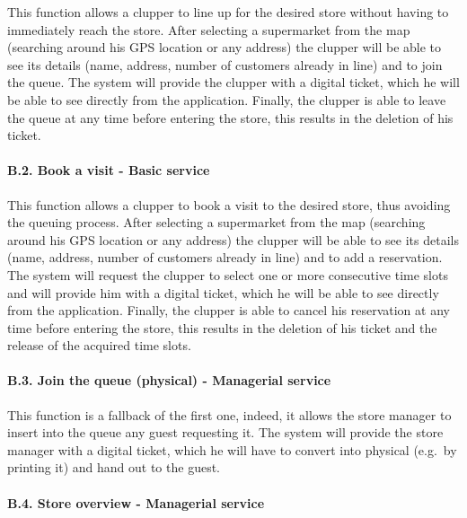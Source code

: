 \documentclass[
]{article}
\begin{document}
This function allows a clupper to line up for the desired store without
having to immediately reach the store. After selecting a supermarket
from the map (searching around his GPS location or any address) the
clupper will be able to see its details (name, address, number of
customers already in line) and to join the queue. The system will
provide the clupper with a digital ticket, which he will be able to see
directly from the application. Finally, the clupper is able to leave the
queue at any time before entering the store, this results in the
deletion of his ticket.

\hypertarget{b.2.-book-a-visit---basic-service}{%
\paragraph{B.2. Book a visit - Basic
service}\label{b.2.-book-a-visit---basic-service}}

This function allows a clupper to book a visit to the desired store,
thus avoiding the queuing process. After selecting a supermarket from
the map (searching around his GPS location or any address) the clupper
will be able to see its details (name, address, number of customers
already in line) and to add a reservation. The system will request the
clupper to select one or more consecutive time slots and will provide
him with a digital ticket, which he will be able to see directly from
the application. Finally, the clupper is able to cancel his reservation
at any time before entering the store, this results in the deletion of
his ticket and the release of the acquired time slots.

\hypertarget{b.3.-join-the-queue-physical---managerial-service}{%
\paragraph{B.3. Join the queue (physical) - Managerial
service}\label{b.3.-join-the-queue-physical---managerial-service}}

This function is a fallback of the first one, indeed, it allows the
store manager to insert into the queue any guest requesting it. The
system will provide the store manager with a digital ticket, which he
will have to convert into physical (e.g.~by printing it) and hand out to
the guest.

\hypertarget{b.4.-store-overview---managerial-service}{%
\paragraph{B.4. Store overview - Managerial
service}\label{b.4.-store-overview---managerial-service}}
\end{document}

